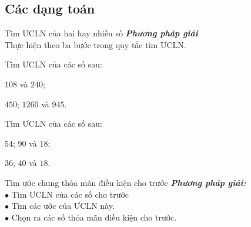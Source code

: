\subsection{Các dạng toán}
\begin{dang}{Tìm ƯCLN của hai hay nhiều số}
	\textbf{\textit{Phương pháp giải}}\\ Thực hiện theo ba bước trong quy tắc tìm ƯCLN.
\end{dang}
\begin{vd}%
	Tìm ƯCLN của các số sau:
	\begin{enumEX}[a)]{2}
		\item $108$ và $240$;
		\item $450$; $1260$ và $945$.
	\end{enumEX}
\end{vd}
\begin{vd}%
	Tìm ƯCLN của các số sau: 
	\begin{enumEX}[a)]{2}
		\item $54$; $90$ và $18$;
		\item $36$; $40$ và $18$.
	\end{enumEX}
\end{vd}
\begin{dang}{Tìm ước chung thỏa mãn điều kiện cho trước}
	\textbf{\textit{Phương pháp giải:}}\\
	$\bullet$ Tìm ƯCLN của các số cho trước\\
	$\bullet$ Tìm các ước của ƯCLN này. \\
	$\bullet$ Chọn ra các số thỏa mãn điều kiện cho trước.
\end{dang}
